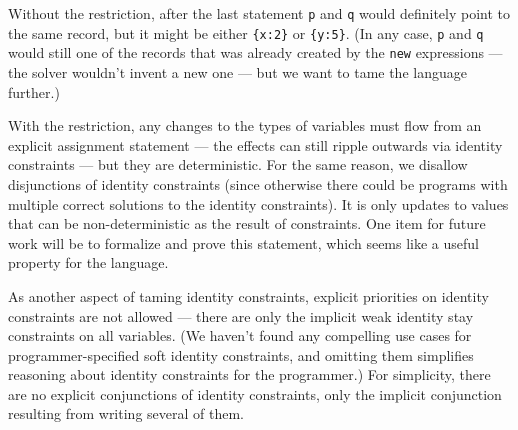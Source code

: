 \documentclass{article}
\def\ab#1{\textcolor{red}{\textsf{AB: #1}}}
\begin{document}
Without the restriction, after the last statement \verb|p| and
\verb|q| would definitely point to the same record, but it might be
either \verb|{x:2}| or \verb|{y:5}|.  (In any case, \verb|p| and
\verb|q| would still one of the records that was already created by
the \verb|new| expressions --- the solver wouldn't invent a new one ---
but we want to tame the language further.)  

With the restriction, any changes to the types of variables must flow
from an explicit assignment statement --- the effects can still ripple
outwards via identity constraints --- but they are deterministic.  For
the same reason, we disallow disjunctions of identity constraints
(since otherwise there could be programs with multiple correct
solutions to the identity constraints).  It is only updates to values
that can be non-deterministic as the result of constraints.  One item
for future work will be to formalize and prove this statement, which
seems like a useful property for the language.





As another aspect of taming identity constraints, explicit priorities
on identity constraints are not allowed --- there are only the
implicit weak identity stay constraints on all variables.  (We haven't
found any compelling use cases for programmer-specified soft identity
constraints, and omitting them simplifies reasoning about identity
constraints for the programmer.)  
For simplicity, there are no explicit conjunctions of identity
constraints, only the implicit conjunction resulting from writing
several of them.
\end{document}

